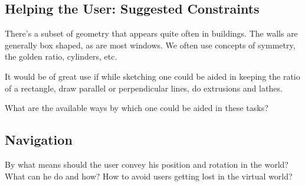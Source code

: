 \subsection{Helping the User: Suggested Constraints}
There's a subset of geometry that appears quite often in buildings.
The walls are generally box shaped, as are most windows. We often use concepts of symmetry,
the golden ratio, cylinders, etc.

It would be of great use if while sketching one could be aided in keeping the ratio of
a rectangle, draw parallel or perpendicular lines, do extrusions and lathes.

What are the available ways by which one could be aided in these tasks?


\subsection{Navigation}
By what means should the user convey his position and rotation in the world? What can he
do and how? How to avoid users getting lost in the virtual world?
